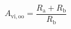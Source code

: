 \begin{equation}
A_{\mathrm{vi},\mathrm{oo}} = \frac{R_{\mathrm{a}} + R_{\mathrm{b}}}{R_{\mathrm{b}}}
\end{equation}

